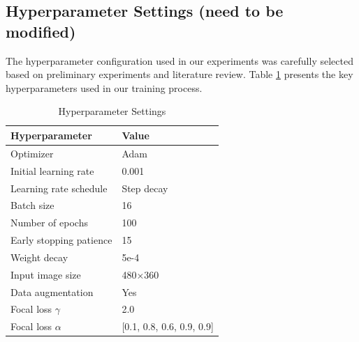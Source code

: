 \documentclass[conference]{IEEEtran}
\begin{document}
\subsection{Hyperparameter Settings (need to be modified)}


The hyperparameter configuration used in our experiments was carefully selected based on preliminary experiments and literature review. Table \ref{tab:hyperparams} presents the key hyperparameters used in our training process.

\begin{table}[htbp]
    \caption{Hyperparameter Settings}
    \label{tab:hyperparams}
    \centering
    \begin{tabular}{ll}
    \hline
    \textbf{Hyperparameter} & \textbf{Value} \\
    \hline
    Optimizer & Adam \\
    Initial learning rate & 0.001 \\
    Learning rate schedule & Step decay \\
    Batch size & 16 \\
    Number of epochs & 100 \\
    Early stopping patience & 15 \\
    Weight decay & 5e-4 \\
    Input image size & 480×360 \\
    Data augmentation & Yes \\
    Focal loss $\gamma$ & 2.0 \\
    Focal loss $\alpha$ & [0.1, 0.8, 0.6, 0.9, 0.9] \\
    \hline
    \end{tabular}
    \end{table}



\end{document}

